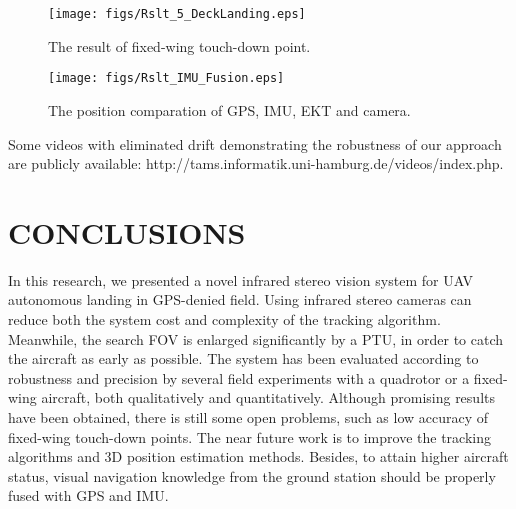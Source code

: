 \documentclass[letterpaper, 10 pt, conference]{ieeeconf}  %
\begin{document}
   \begin{figure}[!tb]
      \centering
      \texttt{[image: figs/Rslt\_5\_DeckLanding.eps]}
      \caption{The result of fixed-wing touch-down point.}
      \label{fig:Rslt_5_DeckLanding}
   \end{figure}
   \begin{figure}[!tb]
      \centering
      \texttt{[image: figs/Rslt\_IMU\_Fusion.eps]}
      \caption{The position comparation of GPS, IMU, EKT and camera.}
      \label{fig:Rslt_IMU_Fusion}
   \end{figure}
Some videos with eliminated drift demonstrating the robustness of our approach are publicly available: http://tams.informatik.uni-hamburg.de/videos/index.php.

\section{CONCLUSIONS}
In this research, we presented a novel infrared stereo vision system for UAV autonomous landing in GPS-denied field. Using infrared stereo cameras can reduce both the system cost and complexity of the tracking algorithm. Meanwhile, the search FOV is enlarged significantly by a PTU, in order to catch the aircraft as early as possible. The system has been evaluated according to robustness and precision by several field experiments with a quadrotor or a fixed-wing aircraft, both qualitatively and quantitatively. Although promising results have been obtained, there is still some open problems, such as low accuracy of fixed-wing touch-down points. The near future work is to improve the tracking algorithms and 3D position estimation methods. Besides, to attain higher aircraft status, visual navigation knowledge from the ground station should be properly fused with GPS and IMU.

\end{document}
